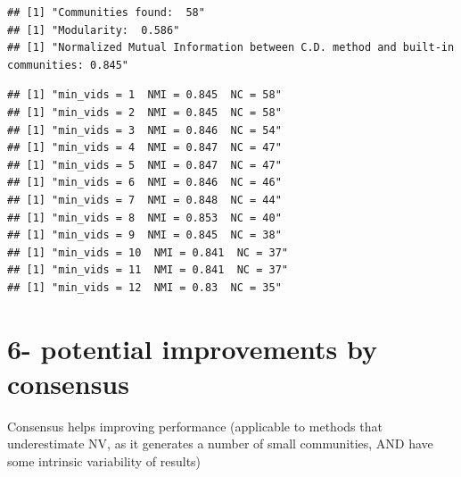 \documentclass[
]{article}
\newenvironment{Shaded}{\begin{snugshade}}{\end{snugshade}}
\newcommand{\AttributeTok}[1]{\textcolor[rgb]{0.77,0.63,0.00}{#1}}
\newcommand{\ConstantTok}[1]{\textcolor[rgb]{0.00,0.00,0.00}{#1}}
\newcommand{\ControlFlowTok}[1]{\textcolor[rgb]{0.13,0.29,0.53}{\textbf{#1}}}
\newcommand{\DecValTok}[1]{\textcolor[rgb]{0.00,0.00,0.81}{#1}}
\newcommand{\FunctionTok}[1]{\textcolor[rgb]{0.00,0.00,0.00}{#1}}
\newcommand{\NormalTok}[1]{#1}
\newcommand{\OtherTok}[1]{\textcolor[rgb]{0.56,0.35,0.01}{#1}}
\newcommand{\SpecialCharTok}[1]{\textcolor[rgb]{0.00,0.00,0.00}{#1}}
\newcommand{\StringTok}[1]{\textcolor[rgb]{0.31,0.60,0.02}{#1}}
\begin{document}
\begin{verbatim}
## [1] "Communities found:  58"
## [1] "Modularity:  0.586"
## [1] "Normalized Mutual Information between C.D. method and built-in communities: 0.845"
\end{verbatim}

\begin{Shaded}
\end{Shaded}

\begin{verbatim}
## [1] "min_vids = 1  NMI = 0.845  NC = 58"
## [1] "min_vids = 2  NMI = 0.845  NC = 58"
## [1] "min_vids = 3  NMI = 0.846  NC = 54"
## [1] "min_vids = 4  NMI = 0.847  NC = 47"
## [1] "min_vids = 5  NMI = 0.847  NC = 47"
## [1] "min_vids = 6  NMI = 0.846  NC = 46"
## [1] "min_vids = 7  NMI = 0.848  NC = 44"
## [1] "min_vids = 8  NMI = 0.853  NC = 40"
## [1] "min_vids = 9  NMI = 0.845  NC = 38"
## [1] "min_vids = 10  NMI = 0.841  NC = 37"
## [1] "min_vids = 11  NMI = 0.841  NC = 37"
## [1] "min_vids = 12  NMI = 0.83  NC = 35"
\end{verbatim}

\newpage

\hypertarget{potential-improvements-by-consensus}{%
\section{6- potential improvements by
consensus}\label{potential-improvements-by-consensus}}

Consensus helps improving performance (applicable to methods that
underestimate NV, as it generates a number of small communities, AND
have some intrinsic variability of results)
\end{document}
